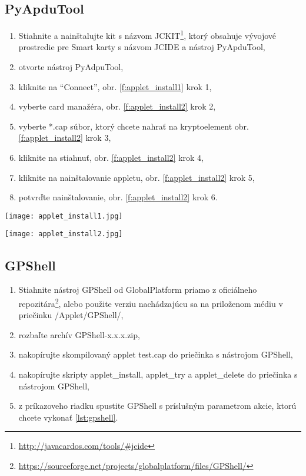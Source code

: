 \documentclass[12pt,a4paper,oneside,openright]{report}
\newcommand{\quotes}[1]{``#1''}
\begin{document}
\subsection{PyApduTool} \label{s_applet_pytool}
	\begin{enumerate}
		\item Stiahnite a nainštalujte kit s názvom JCKIT\footnote{\url{http://javacardos.com/tools/\#jcide}}, ktorý obsahuje vývojové prostredie pre Smart karty s názvom JCIDE a nástroj PyApduTool,
		\item otvorte nástroj PyAdpuTool,
		\item kliknite na \quotes{Connect}, obr. \ref{f:applet_install1} krok 1,
		\item vyberte card manažéra, obr. \ref{f:applet_install2} krok 2,
		\item vyberte *.cap súbor, ktorý chcete nahrať na kryptoelement  obr. \ref{f:applet_install2} krok 3,
		\item kliknite na stiahnuť,  obr. \ref{f:applet_install2} krok 4,
		\item kliknite na nainštalovanie appletu,  obr. \ref{f:applet_install2} krok 5,
		\item potvrďte nainštalovanie,  obr. \ref{f:applet_install2} krok 6. 
	\end{enumerate}
	
	\begin{figure*}[h]
		\centering
		\texttt{[image: applet\_install1.jpg]}
		\caption{Pripojenie čítačky kariet.}
		\label{f:applet_install1}
	\end{figure*}
	\begin{figure*}[h]
		\centering
		\texttt{[image: applet\_install2.jpg]}
		\caption{Nahratie appletu na kryptoelement.}
		\label{f:applet_install2}
	\end{figure*}
		
\subsection{GPShell} \label{s_applet_gpshell}
	\begin{enumerate}
		\item Stiahnite nástroj GPShell od GlobalPlatform priamo z oficiálneho repozitára\footnote{\url{https://sourceforge.net/projects/globalplatform/files/GPShell/}}, alebo použite verziu nachádzajúcu sa na priloženom médiu v priečinku /Applet/GPShell/, 
		\item rozbaľte archív GPShell-x.x.x.zip,
		\item nakopírujte skompilovaný applet test.cap do priečinka s nástrojom GPShell,
		\item nakopírujte skripty applet\_install, applet\_try a applet\_delete do priečinka s nástrojom GPShell,
		\item z príkazoveho riadku spustite GPShell s príslušným parametrom akcie, ktorú chcete vykonať \ref{lst:gpshell}.
	\end{enumerate}
\end{document}
